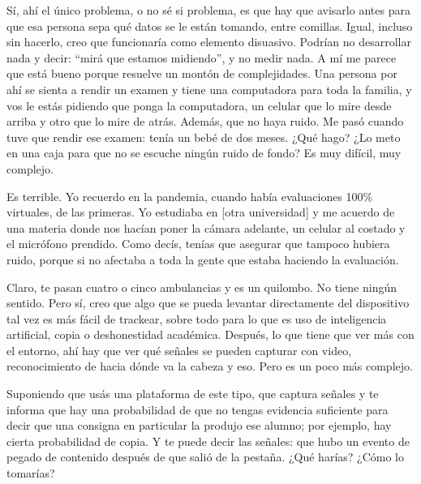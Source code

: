 \begin{description}[leftmargin=0cm, labelsep=0.5cm, style=nextline]
\item[\textbf{Entrevistado:}] Sí, ahí el único problema, o no sé si problema, es que hay que avisarlo antes para que esa persona sepa qué datos se le están tomando, entre comillas. Igual, incluso sin hacerlo, creo que funcionaría como elemento disuasivo. Podrían no desarrollar nada y decir: ``mirá que estamos midiendo'', y no medir nada. A mí me parece que está bueno porque resuelve un montón de complejidades. Una persona por ahí se sienta a rendir un examen y tiene una computadora para toda la familia, y vos le estás pidiendo que ponga la computadora, un celular que lo mire desde arriba y otro que lo mire de atrás. Además, que no haya ruido. Me pasó cuando tuve que rendir ese examen: tenía un bebé de dos meses. ¿Qué hago? ¿Lo meto en una caja para que no se escuche ningún ruido de fondo? Es muy difícil, muy complejo.
\item[\textbf{Entrevistadores:}] Es terrible. Yo recuerdo en la pandemia, cuando había evaluaciones 100\% virtuales, de las primeras. Yo estudiaba en [otra universidad] y me acuerdo de una materia donde nos hacían poner la cámara adelante, un celular al costado y el micrófono prendido. Como decís, tenías que asegurar que tampoco hubiera ruido, porque si no afectaba a toda la gente que estaba haciendo la evaluación.
\item[\textbf{Entrevistado:}] Claro, te pasan cuatro o cinco ambulancias y es un quilombo. No tiene ningún sentido. Pero sí, creo que algo que se pueda levantar directamente del dispositivo tal vez es más fácil de trackear, sobre todo para lo que es uso de inteligencia artificial, copia o deshonestidad académica. Después, lo que tiene que ver más con el entorno, ahí hay que ver qué señales se pueden capturar con video, reconocimiento de hacia dónde va la cabeza y eso. Pero es un poco más complejo.
\item[\textbf{Entrevistadores:}] Suponiendo que usás una plataforma de este tipo, que captura señales y te informa que hay una probabilidad de que no tengas evidencia suficiente para decir que una consigna en particular la produjo ese alumno; por ejemplo, hay cierta probabilidad de copia. Y te puede decir las señales: que hubo un evento de pegado de contenido después de que salió de la pestaña. ¿Qué harías? ¿Cómo lo tomarías?

\end{description}
